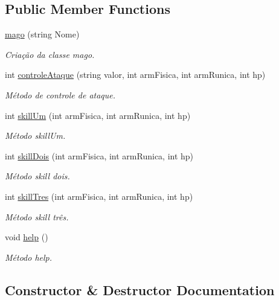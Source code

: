 \subsection*{Public Member Functions}
\begin{DoxyCompactItemize}
\item 
\mbox{\hyperlink{classmago_ae5292ae10f4e5cae0a4a73d185807fbc}{mago}} (string Nome)
\begin{DoxyCompactList}\small\item\em Criação da classe mago. \end{DoxyCompactList}\item 
int \mbox{\hyperlink{classmago_af10f6c9bcbbf77870f376a48b1cd0601}{controle\+Ataque}} (string valor, int arm\+Fisica, int arm\+Runica, int hp)
\begin{DoxyCompactList}\small\item\em Método de controle de ataque. \end{DoxyCompactList}\item 
int \mbox{\hyperlink{classmago_a039c9975fad5dbc54d5f3ab51bf3df44}{skill\+Um}} (int arm\+Fisica, int arm\+Runica, int hp)
\begin{DoxyCompactList}\small\item\em Método skill\+Um. \end{DoxyCompactList}\item 
int \mbox{\hyperlink{classmago_ac0a8309b459ab7f27f356eff72817c2f}{skill\+Dois}} (int arm\+Fisica, int arm\+Runica, int hp)
\begin{DoxyCompactList}\small\item\em Método skill dois. \end{DoxyCompactList}\item 
int \mbox{\hyperlink{classmago_a77280ba40aac7fdf8766950261821a39}{skill\+Tres}} (int arm\+Fisica, int arm\+Runica, int hp)
\begin{DoxyCompactList}\small\item\em Método skill três. \end{DoxyCompactList}\item 
void \mbox{\hyperlink{classmago_a8953a4898dea53c2c4a63542f49a7d86}{help}} ()
\begin{DoxyCompactList}\small\item\em Método help. \end{DoxyCompactList}\end{DoxyCompactItemize}


\subsection{Constructor \& Destructor Documentation}
\mbox{\label{classmago_ae5292ae10f4e5cae0a4a73d185807fbc}} 
